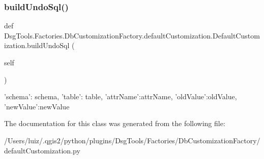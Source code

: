 \subsubsection{\texorpdfstring{build\+Undo\+Sql()}{buildUndoSql()}}
{\footnotesize\ttfamily def Dsg\+Tools.\+Factories.\+Db\+Customization\+Factory.\+default\+Customization.\+Default\+Customization.\+build\+Undo\+Sql (\begin{DoxyParamCaption}\item[{}]{self }\end{DoxyParamCaption})}

\begin{DoxyVerb}{'schema': schema, 'table': table, 'attrName':attrName, 'oldValue':oldValue, 'newValue':newValue}
\end{DoxyVerb}
 

The documentation for this class was generated from the following file\+:\begin{DoxyCompactItemize}
\item 
/\+Users/luiz/.\+qgis2/python/plugins/\+Dsg\+Tools/\+Factories/\+Db\+Customization\+Factory/default\+Customization.\+py\end{DoxyCompactItemize}
